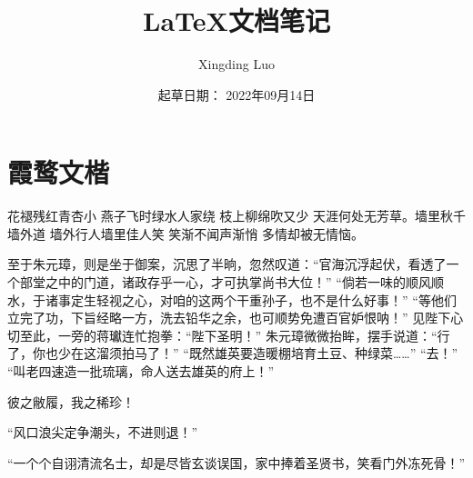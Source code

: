 \documentclass[12pt, letterpaper]{article}
\title{LaTeX文档笔记}
\author{Xingding Luo}
\date{起草日期： 2022年09月14日}
\begin{document}
\begin{titlepage}
		\maketitle
\end{titlepage}
		\tableofcontents
		\section{霞鹜文楷}


		花褪残红青杏小 燕子飞时绿水人家绕 枝上柳绵吹又少 天涯何处无芳草。墙里秋千墙外道 墙外行人墙里佳人笑  笑渐不闻声渐悄 多情却被无情恼。

		至于朱元璋，则是坐于御案，沉思了半晌，忽然叹道：“官海沉浮起伏，看透了一个部堂之中的门道，诸政存乎一心，才可执掌尚书大位！”
		“倘若一味的顺风顺水，于诸事定生轻视之心，对咱的这两个干重孙子，也不是什么好事！”
		“等他们立完了功，下旨经略一方，洗去铅华之余，也可顺势免遭百官妒恨呐！”
		见陛下心切至此，一旁的蒋瓛连忙抱拳：“陛下圣明！”
		朱元璋微微抬眸，摆手说道：“行了，你也少在这溜须拍马了！”
		“既然雄英要造暖棚培育土豆、种绿菜……”
		“去！”
		“叫老四速造一批琉璃，命人送去雄英的府上！”

		彼之敝履，我之稀珍！

		“风口浪尖定争潮头，不进则退！”

		“一个个自诩清流名士，却是尽皆玄谈误国，家中捧着圣贤书，笑看门外冻死骨！”
\end{document}
